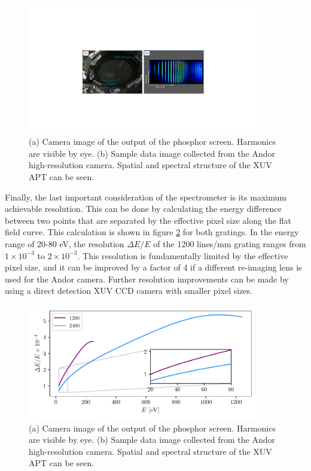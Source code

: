 \begin{figure}
	\centering
	\includegraphics[width=0.9\textwidth]{figures/Beamline/spectrometer_output.pdf}
	\caption[Image of phosphor output of high harmonics generated from two sources and sample data image]{(a) Camera image of the output of the phosphor screen.  Harmonics are visible by eye.  (b) Sample data image collected from the Andor high-resolution camera.  Spatial and spectral structure of the XUV APT can be seen.}
	\label{fig:spectrometer_output}
\end{figure}

Finally, the last important consideration of the spectrometer is its maximum achievable resolution.  This can be done by calculating the energy difference between two points that are separated by the effective pixel size along the flat field curve.  This calculation is shown in figure \ref{fig:grating_resolution} for both gratings.  In the energy range of 20-80 eV, the resolution $\Delta E/E$ of the 1200 lines/mm grating ranges from $1\times10^{-3}$ to $2\times10^{-3}$.  This resolution is fundamentally limited by the effective pixel size, and it can be improved by a factor of 4 if a different re-imaging lens is used for the Andor camera. Further resolution improvements can be made by using a direct detection XUV CCD camera with smaller pixel sizes.
\begin{figure}
	\centering
	\includegraphics[width=0.9\textwidth]{figures/Beamline/grating_resolution.pdf}
	\caption[Image of phosphor output of high harmonics generated from two sources and sample data image]{(a) Camera image of the output of the phosphor screen.  Harmonics are visible by eye.  (b) Sample data image collected from the Andor high-resolution camera.  Spatial and spectral structure of the XUV APT can be seen.}
	\label{fig:grating_resolution}
\end{figure}



